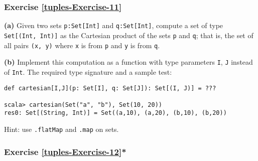 \subsubsection{Exercise \label{tuples-Exercise-11}\ref{tuples-Exercise-11}}

\textbf{(a)} Given two sets \lstinline!p:Set[Int]!
and \lstinline!q:Set[Int]!,
compute a set of type \lstinline!Set[(Int, Int)]!
as the Cartesian product of the sets \lstinline!p!
and \lstinline!q!; that
is, the set of all pairs \lstinline!(x, y)!
where \lstinline!x! is
from \lstinline!p! and
\lstinline!y! is from \lstinline!q!. 

\textbf{(b)} Implement this computation as a function with type parameters
\lstinline!I!, \lstinline!J!
instead of \lstinline!Int!.
The required type signature and a sample test:
\begin{lstlisting}
def cartesian[I,J](p: Set[I], q: Set[J]): Set[(I, J)] = ???

scala> cartesian(Set("a", "b"), Set(10, 20))
res0: Set[(String, Int)] = Set((a,10), (a,20), (b,10), (b,20))
\end{lstlisting}
Hint: use \lstinline!.flatMap!
and \lstinline!.map! on
sets.%
\begin{comment}
Solution:\inputencoding{latin9}
\begin{lstlisting}
a.flatMap(x => b.map(y => (x, y)))
\end{lstlisting}
\inputencoding{utf8}\end{comment}


\subsubsection{Exercise \label{tuples-Exercise-12}\ref{tuples-Exercise-12}{*}}

